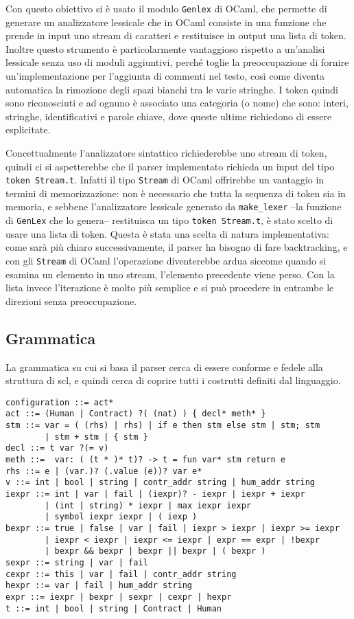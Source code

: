 \documentclass[]{article}
\begin{document}
Con questo obiettivo si è usato il modulo \texttt{Genlex} di OCaml, che
permette di generare un analizzatore lessicale che in OCaml consiste in
una funzione che prende in input uno stream di caratteri e restituisce
in output una lista di token. Inoltre questo strumento è particolarmente
vantaggioso rispetto a un'analisi lessicale senza uso di moduli
aggiuntivi, perché toglie la preoccupazione di fornire
un'implementazione per l'aggiunta di commenti nel testo, così come
diventa automatica la rimozione degli spazi bianchi tra le varie
stringhe. I token quindi sono riconosciuti e ad ognuno è associato una
categoria (o nome) che sono: interi, stringhe, identificativi e parole
chiave, dove queste ultime richiedono di essere esplicitate.

Concettualmente l'analizzatore sintattico richiederebbe uno stream di
token, quindi ci si aspetterebbe che il parser implementato richieda un
input del tipo \texttt{token\ Stream.t}. Infatti il tipo \texttt{Stream}
di OCaml offrirebbe un vantaggio in termini di memorizzazione: non è
necessario che tutta la sequenza di token sia in memoria, e sebbene
l'analizzatore lessicale generato da \texttt{make\_lexer} --la funzione
di \texttt{GenLex} che lo genera-- restituisca un tipo
\texttt{token\ Stream.t}, è stato scelto di usare una lista di token.
Questa è stata una scelta di natura implementativa: come sarà più chiaro
successivamente, il parser ha bisogno di fare backtracking, e con gli
\texttt{Stream} di OCaml l'operazione diventerebbe ardua siccome quando
si esamina un elemento in uno stream, l'elemento precedente viene perso.
Con la lista invece l'iterazione è molto più semplice e si può procedere
in entrambe le direzioni senza preoccupazione.

\hypertarget{grammatica}{%
\subsection{Grammatica}\label{grammatica}}

La grammatica su cui si basa il parser cerca di essere conforme e fedele
alla struttura di scl, e quindi cerca di coprire tutti i costrutti
definiti dal linguaggio.

\begin{verbatim}
configuration ::= act*
act ::= (Human | Contract) ?( (nat) ) { decl* meth* }
stm ::= var = ( (rhs) | rhs) | if e then stm else stm | stm; stm 
        | stm + stm | { stm }
decl ::= t var ?(= v)
meth ::=  var: ( (t * )* t)? -> t = fun var* stm return e
rhs ::= e | (var.)? (.value (e))? var e*
v ::= int | bool | string | contr_addr string | hum_addr string
iexpr ::= int | var | fail | (iexpr)? - iexpr | iexpr + iexpr 
        | (int | string) * iexpr | max iexpr iexpr 
        | symbol iexpr iexpr | ( iexp )
bexpr ::= true | false | var | fail | iexpr > iexpr | iexpr >= iexpr 
        | iexpr < iexpr | iexpr <= iexpr | expr == expr | !bexpr 
        | bexpr && bexpr | bexpr || bexpr | ( bexpr )  
sexpr ::= string | var | fail
cexpr ::= this | var | fail | contr_addr string
hexpr ::= var | fail | hum_addr string
expr ::= iexpr | bexpr | sexpr | cexpr | hexpr
t ::= int | bool | string | Contract | Human
\end{verbatim}
\end{document}
